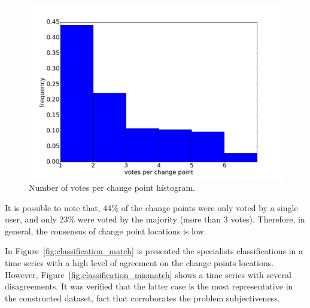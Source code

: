 \begin{figure}[H]
    \centering
    \includegraphics[width=0.7\linewidth]{./figures/methodology/supervised_learning_try/cnt_classifications_per_vote.png}
    \caption{Number of votes per change point histogram.}
\label{fig:classifications_per_vote}
\end{figure}%

It is possible to note that, 44\% of the change points were only voted by
a single user, and only 23\% were voted by the majority (more than 3 votes).
Therefore, in general, the consensus of change point locations is low.

In Figure~\ref{fig:classification_match} is presented the specialists
classifications in a time series with a high level of agreement on the change
points locations.
However, Figure~\ref{fig:classification_mismatch} shows a time series with
several disagreements.
It was verified that the latter case is the most representative in the
constructed dataset, fact that corroborates the problem subjectiveness.

